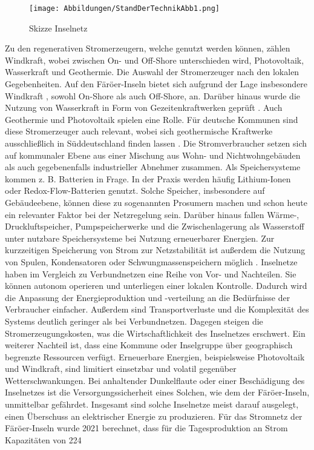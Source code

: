 \begin{figure}[h!]
    \centering
    \texttt{[image: Abbildungen/StandDerTechnikAbb1.png]}
    \caption{Skizze Inselnetz}\label{fig:Skizze_Inselnetz}
\end{figure}

Zu den regenerativen Stromerzeugern, welche genutzt werden können, zählen Windkraft, wobei zwischen On- und Off-Shore unterschieden wird, Photovoltaik, Wasserkraft und Geothermie. Die Auswahl der Stromerzeuger nach den lokalen Gegebenheiten. Auf den Färöer-Inseln bietet sich aufgrund der Lage insbesondere Windkraft , sowohl On-Shore als auch Off-Shore, an. Darüber hinaus wurde die Nutzung von Wasserkraft in Form von Gezeitenkraftwerken geprüft . Auch Geothermie und Photovoltaik spielen eine Rolle. Für deutsche Kommunen sind diese Stromerzeuger auch relevant, wobei sich geothermische Kraftwerke ausschließlich in Süddeutschland finden lassen . Die Stromverbraucher setzen sich auf kommunaler Ebene aus einer Mischung aus Wohn- und Nichtwohngebäuden als auch gegebenenfalls industrieller Abnehmer zusammen. Als Speichersysteme kommen z. B. Batterien in Frage. In der Praxis werden häufig Lithium-Ionen oder Redox-Flow-Batterien genutzt. Solche Speicher, insbesondere auf Gebäudeebene, können diese zu sogenannten Prosumern  machen und schon heute ein relevanter Faktor bei der Netzregelung sein. Darüber hinaus fallen Wärme-, Druckluftspeicher, Pumpspeicherwerke und die Zwischenlagerung als Wasserstoff unter nutzbare Speichersysteme bei Nutzung erneuerbarer Energien. Zur kurzzeitigen Speicherung von Strom zur Netzstabilität ist außerdem die Nutzung von Spulen, Kondensatoren oder Schwungmassenspeichern möglich . 
Inselnetze haben im Vergleich zu Verbundnetzen eine Reihe von Vor- und Nachteilen. Sie können autonom operieren und unterliegen einer lokalen Kontrolle. Dadurch wird die Anpassung der Energieproduktion und -verteilung an die Bedürfnisse der Verbraucher einfacher. Außerdem sind Transportverluste und die Komplexität des Systems deutlich geringer als bei Verbundnetzen. Dagegen steigen die Stromerzeugungskosten, was die Wirtschaftlichkeit des Inselnetzes erschwert. Ein weiterer Nachteil ist, dass eine Kommune oder Inselgruppe über geographisch begrenzte Ressourcen verfügt. Erneuerbare Energien, beispielsweise Photovoltaik und Windkraft, sind limitiert einsetzbar und volatil gegenüber Wetterschwankungen. Bei anhaltender Dunkelflaute oder einer Beschädigung des Inselnetzes ist die Versorgungssicherheit eines Solchen, wie dem der Färöer-Inseln, unmittelbar gefährdet.
Insgesamt sind solche Inselnetze meist darauf ausgelegt, einen Überschuss an elektrischer Energie zu produzieren. Für das Stromnetz der Färöer-Inseln wurde 2021 berechnet, dass für die Tagesproduktion an Strom Kapazitäten von 224%
 
